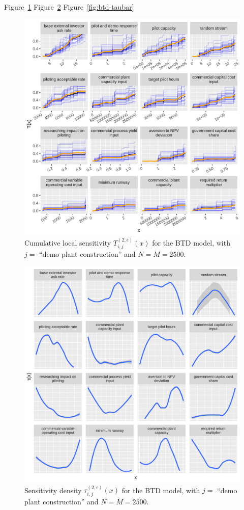 \documentclass[12pt]{article}
\begin{document}
Figure~\ref{fig:btd-t}
Figure~\ref{fig:btd-tau}
Figure~\ref{fig:btd-taubar}

\begin{figure}
    \centering
    \includegraphics[width=\linewidth]{figures/btd-t.png}
    \caption{Cumulative local sensitivity $T_{i,j}^{(2,\epsilon)}(x)$ for the BTD model, with $j =$ ``demo plant construction'' and $N = M = 2500$.}
    \label{fig:btd-t}
\end{figure}

\begin{figure}
    \centering
    \includegraphics[width=\linewidth]{figures/btd-tau.png}
    \caption{Sensitivity density $\tau_{i,j}^{(2,\epsilon)}(x)$ for the BTD model, with $j =$ ``demo plant construction'' and $N = M = 2500$.}
    \label{fig:btd-tau}
\end{figure}
\end{document}
